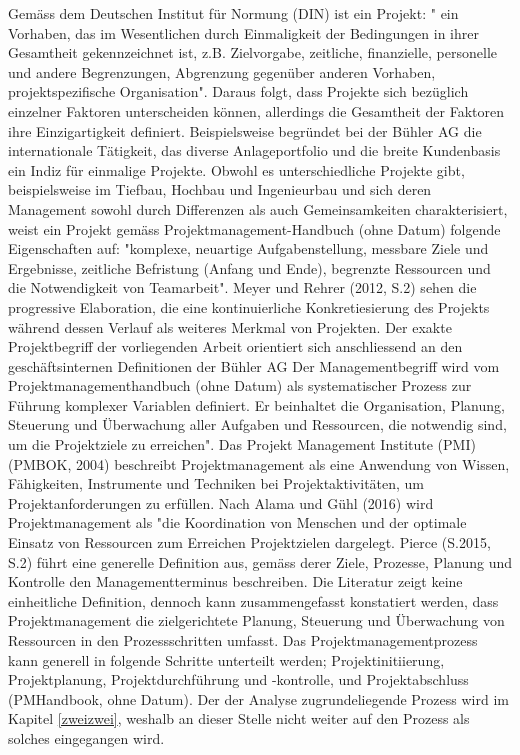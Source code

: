 Gemäss dem Deutschen Institut für Normung (DIN) ist ein Projekt: " ein Vorhaben, das im Wesentlichen durch Einmaligkeit der Bedingungen in ihrer Gesamtheit gekennzeichnet ist, z.B. Zielvorgabe, zeitliche, finanzielle, personelle und andere Begrenzungen, Abgrenzung gegenüber anderen Vorhaben, projektspezifische Organisation". Daraus folgt, dass Projekte sich bezüglich einzelner Faktoren unterscheiden können, allerdings die Gesamtheit der Faktoren ihre Einzigartigkeit definiert. Beispielsweise begründet bei der Bühler AG die internationale Tätigkeit, das diverse Anlageportfolio und die breite Kundenbasis ein Indiz für einmalige Projekte. Obwohl es unterschiedliche Projekte gibt, beispielsweise im Tiefbau, Hochbau und Ingenieurbau und sich deren Management sowohl durch Differenzen als auch Gemeinsamkeiten charakterisiert, weist ein Projekt gemäss Projektmanagement-Handbuch (ohne Datum) folgende Eigenschaften auf: "komplexe, neuartige Aufgabenstellung, messbare Ziele und Ergebnisse, zeitliche Befristung (Anfang und Ende), begrenzte Ressourcen und die Notwendigkeit von Teamarbeit". Meyer und Rehrer (2012, S.2) sehen die progressive Elaboration, die eine kontinuierliche Konkretiesierung des Projekts während dessen Verlauf als weiteres Merkmal von Projekten. Der exakte Projektbegriff der vorliegenden Arbeit orientiert sich anschliessend an den geschäftsinternen Definitionen der Bühler AG
\newline
Der Managementbegriff wird vom Projektmanagementhandbuch (ohne Datum) als systematischer Prozess zur Führung komplexer Variablen definiert. Er beinhaltet die Organisation, Planung, Steuerung und Überwachung aller Aufgaben und Ressourcen, die notwendig sind, um die Projektziele zu erreichen". Das Projekt Management Institute (PMI) (PMBOK, 2004) beschreibt Projektmanagement als eine Anwendung von Wissen, Fähigkeiten, Instrumente und Techniken bei Projektaktivitäten, um Projektanforderungen zu erfüllen. Nach Alama und Gühl (2016) wird Projektmanagement als "die Koordination von Menschen und der optimale Einsatz von Ressourcen zum Erreichen Projektzielen dargelegt. Pierce (S.2015, S.2) führt eine generelle Definition aus, gemäss derer Ziele, Prozesse, Planung und Kontrolle den Managementterminus beschreiben. Die Literatur zeigt keine einheitliche Definition, dennoch kann zusammengefasst konstatiert werden, dass Projektmanagement die zielgerichtete Planung, Steuerung und Überwachung von  Ressourcen in den Prozessschritten umfasst. Das Projektmanagementprozess kann generell in folgende Schritte unterteilt werden; Projektinitiierung, Projektplanung, Projektdurchführung und -kontrolle, und Projektabschluss (PMHandbook, ohne Datum). Der der Analyse zugrundeliegende Prozess wird im Kapitel \ref{zweizwei}, weshalb an dieser Stelle nicht weiter auf den Prozess als solches eingegangen wird. 
